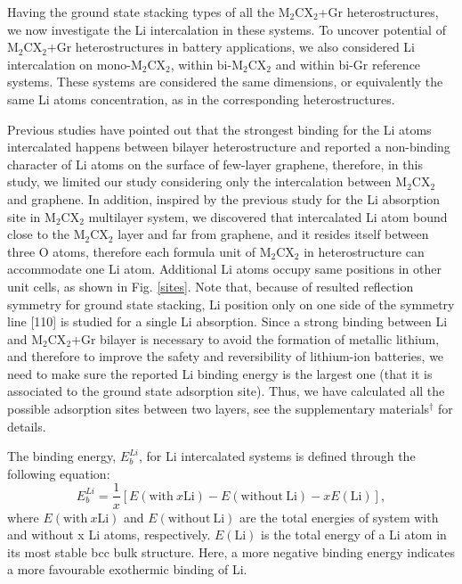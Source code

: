 Having the ground state stacking types of all the M$_2$CX$_2$+Gr heterostructures, we now investigate the Li intercalation in these systems. To uncover potential of M$_2$CX$_2$+Gr heterostructures in battery applications, we also considered Li intercalation on mono-M$_2$CX$_2$, within bi-M$_2$CX$_2$ and within bi-Gr reference systems. These systems are considered the same dimensions, or equivalently the same Li atoms concentration, as in the corresponding heterostructures.

Previous studies\cite{Guo2015,Samad2016,Lee2012} have pointed out that the strongest binding for the Li atoms intercalated happens between bilayer heterostructure and reported a non-binding character of Li atoms on the surface of few-layer graphene, therefore, in this study, we limited our study considering only the intercalation between M$_2$CX$_2$ and graphene. In addition, inspired by the previous study\cite{doi:10.1063/1.4939745} for the Li absorption site in M$_2$CX$_2$ multilayer system, we discovered that intercalated Li atom bound close to the M$_2$CX$_2$ layer and far from graphene, and it resides itself between three O atoms, therefore each formula unit of M$_2$CX$_2$ in heterostructure can accommodate one Li atom. Additional Li atoms occupy same positions in other unit cells, as shown in Fig. \ref{sites}. Note that, because of resulted reflection symmetry for ground state stacking, Li position only on one side of the symmetry line [110] is studied for a single Li absorption.  Since a strong binding between Li and M$_2$CX$_2$+Gr bilayer is necessary to avoid the formation of metallic lithium, and therefore to improve the safety and reversibility of lithium-ion batteries, we need to make sure the reported Li binding energy is the largest one (that it is associated to the ground state adsorption site). Thus, we have calculated all the possible adsorption sites between two layers, see the supplementary materials$^\dag$ for details. 

The binding energy, $E_{b}^{Li}$, for Li intercalated systems is defined through the following equation:
\begin{equation}
E_{b}^{Li}=\frac{1}{x}[E(\mathrm{with~}x\mathrm{Li})-E(\mathrm{without~Li})-xE(\mathrm{Li})],
\end{equation}
where $E(\mathrm{with~}x\mathrm{Li})$ and $E(\mathrm{without~Li})$ are the total energies of system with and without x Li atoms, respectively. $E(\mathrm{Li})$ is the total energy of a Li atom in its most stable bcc bulk structure. Here, a more negative binding energy indicates a more favourable exothermic binding of Li. 

